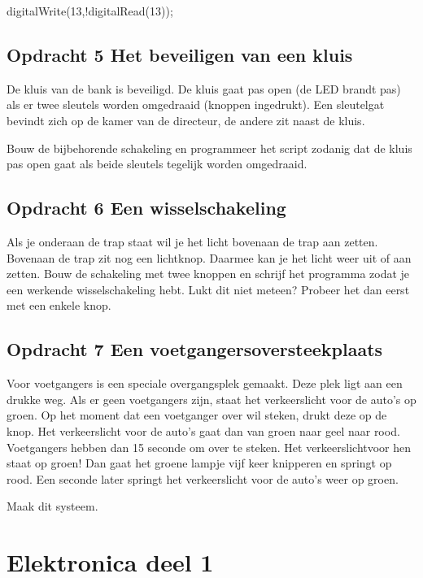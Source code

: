 \documentclass{arduino}
\begin{document}
\begin{marginlisting}
digitalWrite(13,!digitalRead(13));
\end{marginlisting}

\newpage

\subsection{Opdracht 5 Het beveiligen van een kluis}

De kluis van de bank is beveiligd. De kluis gaat pas open (de LED brandt pas) als er twee sleutels worden omgedraaid (knoppen ingedrukt). Een sleutelgat bevindt zich op de kamer van de directeur, de andere zit naast de kluis.

Bouw de bijbehorende schakeling en programmeer het script zodanig dat de kluis pas open gaat als beide sleutels tegelijk worden omgedraaid.

\subsection{Opdracht 6 Een wisselschakeling}

Als je onderaan de trap staat wil je het licht bovenaan de trap aan zetten. Bovenaan de trap zit nog een lichtknop. Daarmee kan je het licht weer uit of aan zetten. Bouw de schakeling met twee knoppen en schrijf het programma zodat je een werkende wisselschakeling hebt. Lukt dit niet meteen? Probeer het dan eerst met een enkele knop. 

\subsection{Opdracht 7 Een voetgangersoversteekplaats}

Voor voetgangers is een speciale overgangsplek gemaakt. Deze plek ligt aan een drukke weg. Als er geen voetgangers zijn, staat het verkeerslicht voor de auto’s op groen. Op het moment dat een voetganger over wil steken, drukt deze op de knop. Het verkeerslicht voor de auto’s gaat dan van groen naar geel naar rood. Voetgangers hebben dan 15 seconde om over te steken. Het verkeerslichtvoor hen staat op groen! Dan gaat het groene lampje vijf keer knipperen en springt op rood. Een seconde later springt het verkeerslicht voor de auto’s weer op groen. 

Maak dit systeem.

\newpage

\section{Elektronica deel 1}
\end{document}
